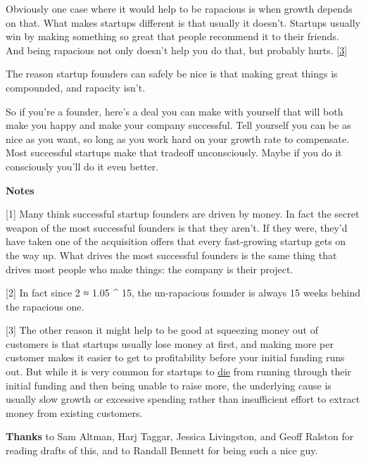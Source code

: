 Obviously one case where it would help to be rapacious is when growth
depends on that. What makes startups different is that usually it
doesn't. Startups usually win by making something so great that people
recommend it to their friends. And being rapacious not only doesn't help
you do that, but probably hurts. {[}\hyperref[f3n]{3}{]}

The reason startup founders can safely be nice is that making great
things is compounded, and rapacity isn't.

So if you're a founder, here's a deal you can make with yourself that
will both make you happy and make your company successful. Tell yourself
you can be as nice as you want, so long as you work hard on your growth
rate to compensate. Most successful startups make that tradeoff
unconsciously. Maybe if you do it consciously you'll do it even better.

\textbf{Notes}

{[}1{]} Many think successful startup founders are driven by money. In
fact the secret weapon of the most successful founders is that they
aren't. If they were, they'd have taken one of the acquisition offers
that every fast-growing startup gets on the way up. What drives the most
successful founders is the same thing that drives most people who make
things: the company is their project.

{[}2{]} In fact since 2 ≈ 1.05 \^{} 15, the un-rapacious founder is
always 15 weeks behind the rapacious one.

{[}3{]} The other reason it might help to be good at squeezing money out
of customers is that startups usually lose money at first, and making
more per customer makes it easier to get to profitability before your
initial funding runs out. But while it is very common for startups to
\href{pinch.html}{die} from running through their initial funding and
then being unable to raise more, the underlying cause is usually slow
growth or excessive spending rather than insufficient effort to extract
money from existing customers.

\textbf{Thanks} to Sam Altman, Harj Taggar, Jessica Livingston, and
Geoff Ralston for reading drafts of this, and to Randall Bennett for
being such a nice guy.
